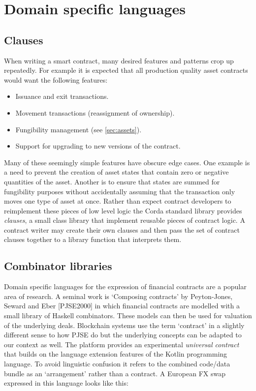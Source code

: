 \documentclass{article}
\begin{document}

\section{Domain specific languages}

\subsection{Clauses}
When writing a smart contract, many desired features and patterns crop up repeatedly. For example it is expected
that all production quality asset contracts would want the following features:

\begin{itemize}
\item Issuance and exit transactions.
\item Movement transactions (reassignment of ownership).
\item Fungibility management (see \cref{sec:assets}).
\item Support for upgrading to new versions of the contract.
\end{itemize}

Many of these seemingly simple features have obscure edge cases. One example is a need to prevent the creation of
asset states that contain zero or negative quantities of the asset. Another is to ensure that states are summed
for fungibility purposes without accidentally assuming that the transaction only moves one type of asset at once.
Rather than expect contract developers to reimplement these pieces of low level logic the Corda standard library
provides \emph{clauses}, a small class library that implement reusable pieces of contract logic. A contract writer
may create their own clauses and then pass the set of contract clauses together to a library function that
interprets them.

\subsection{Combinator libraries}
Domain specific languages for the expression of financial contracts are a popular area of research. A seminal work
is `Composing contracts' by Peyton-Jones, Seward and Eber [PJSE2000\cite{PeytonJones:2000:CCA:357766.351267}] in which
financial contracts are modelled with a small library of Haskell combinators. These models can then be used for
valuation of the underlying deals. Blockchain systems use the term `contract' in a slightly different sense to
how PJSE do but the underlying concepts can be adapted to our context as well. The platform provides an
experimental \emph{universal contract} that builds on the language extension features of the Kotlin programming
language. To avoid linguistic confusion it refers to the combined code/data bundle as an `arrangement' rather
than a contract. A European FX swap expressed in this language looks like this:
\end{document}
